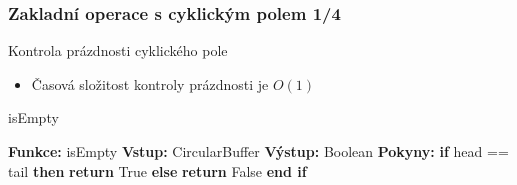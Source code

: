 \documentclass[]{fitthesispresn}
\begin{document}
    \begin{frame}
        \frametitle{Zakladní operace s cyklickým polem 1/4}
        Kontrola prázdnosti cyklického pole
        \begin{itemize}
            \item Časová složitost kontroly prázdnosti je $O(1)$
        \end{itemize}
        \begin{algorithm}[H]
            \caption{isEmpty}
            \label{alg:isempty}
            \begin{algorithmic}[1]
                \State \textbf{Funkce:} isEmpty
                \State \textbf{Vstup:} CircularBuffer
                \State \textbf{Výstup:} Boolean
                \State \textbf{Pokyny:}
                \State \hspace{\algorithmicindent} \textbf{if} head == tail \textbf{then}
                \State \hspace{\algorithmicindent} \hspace{\algorithmicindent} \textbf{return} True
                \State \hspace{\algorithmicindent} \textbf{else}
                \State \hspace{\algorithmicindent} \hspace{\algorithmicindent} \textbf{return} False
                \State \hspace{\algorithmicindent} \textbf{end if}
            \end{algorithmic}
        \end{algorithm}
    \end{frame}
\end{document}
